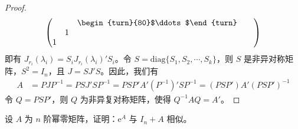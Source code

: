\documentclass[../../main.tex]{subfiles}
\begin{document}
\begin{proof}
\begin{align*}
\begin{pmatrix}
& & \begin{turn}{80}$\ddots$\end{turn} & & \\
& 1 & & & \\
1 & & & &
\end{pmatrix}
\end{align*}
即有 $J_{r_i}(\lambda_i) = S_iJ_{r_i}(\lambda_i)'S_i$。令 $S = \mathrm{diag}\{S_1,S_2,\cdots,S_k\}$，则 $S$ 是非异对称矩阵，$S^2 = I_n$，且 $J = SJ'S$。因此，我们有
\begin{align*}
A &= PJP^{-1} = PSJ'SP^{-1} = PSP'A'(P^{-1})'SP^{-1} = (PSP')A'(PSP')^{-1}
\end{align*}
令 $Q = PSP'$，则 $Q$ 为非异复对称矩阵，使得 $Q^{-1}AQ = A'$。
\end{proof}

\begin{proposition}\label{proposition:e^A与I_n+A相似}
设 $A$ 为 $n$ 阶幂零矩阵，证明：$\mathrm{e}^A$ 与 $I_n + A$ 相似。
\end{proposition}
\end{document}
